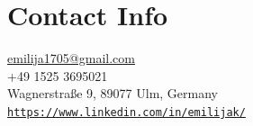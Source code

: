 \section*{Contact Info}
\small{
    \href{mailto:emilija1705@gmail.com}{emilija1705@gmail.com} \\
    +49 1525 3695021 \\
    Wagnerstraße 9, 89077 Ulm, Germany \\
    \href{https://www.linkedin.com/in/emilijak/}{\nolinkurl{https://www.linkedin.com/in/emilijak/}}
}
